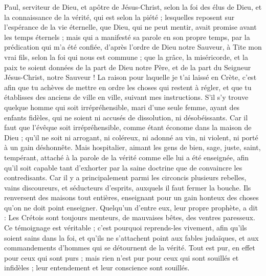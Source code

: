 \begin{multicols}{2}
\VerseOne{}Paul, serviteur de Dieu, et apôtre de Jésus-Christ, selon la foi des élus de Dieu, et la connaissance de la vérité, qui est selon la piété ;
lesquelles reposent sur l'espérance de la vie éternelle, que Dieu, qui ne peut mentir, avait promise avant les temps éternels ;
mais qui a manifesté sa parole en son propre temps, par la prédication qui m’a été confiée, d’après l’ordre de Dieu notre Sauveur,
à Tite mon vrai fils, selon la foi qui nous est commune ; que la grâce, la miséricorde, et la paix te soient données de la part de Dieu notre Père, et de la part du Seigneur Jésus-Christ, notre Sauveur !
La raison pour laquelle je t'ai laissé en Crète, c'est afin que tu achèves de mettre en ordre les choses qui restent à régler, et que tu établisses des anciens de ville en ville, suivant mes instructions.
S’il s’y trouve quelque homme qui soit irrépréhensible, mari d'une seule femme, ayant des enfants fidèles, qui ne soient ni accusés de dissolution, ni désobéissants.
Car il faut que l'évêque soit irrépréhensible, comme étant économe dans la maison de Dieu ; qu’il ne soit ni arrogant, ni coléreux, ni adonné au vin, ni violent, ni porté à un gain déshonnête.
Mais hospitalier, aimant les gens de bien, sage, juste, saint, tempérant,
attaché à la parole de la vérité comme elle lui a été enseignée, afin qu'il soit capable tant d'exhorter par la saine doctrine que de convaincre les contredisants.
Car il y a principalement parmi les circoncis plusieurs rebelles, vains discoureurs, et séducteurs d'esprits,
auxquels il faut fermer la bouche. Ils renversent des maisons tout entières, enseignant pour un gain honteux des choses qu'on ne doit point enseigner.
Quelqu'un d'entre eux, leur propre prophète, a dit : Les Crétois sont toujours menteurs, de mauvaises bêtes, des ventres paresseux.
Ce témoignage est véritable ; c'est pourquoi reprends-les vivement, afin qu'ils soient sains dans la foi,
et qu’ils ne s’attachent point aux fables judaïques, et aux commandements d’hommes qui se détournent de la vérité.
Tout est pur, en effet pour ceux qui sont purs ; mais rien n'est pur pour ceux qui sont souillés et infidèles ; leur entendement et leur conscience sont souillés.

\end{multicols}
